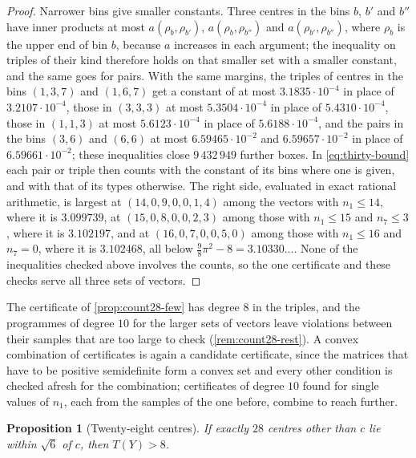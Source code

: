 \documentclass[11pt,reqno]{amsart}
\renewcommand{\_}{\origunderscore\allowbreak}
\numberwithin{equation}{section}
\theoremstyle{plain}
\newtheorem{prop}[thm]{Proposition}
\theoremstyle{definition}
\theoremstyle{remark}
\begin{document}
\begin{proof}
Narrower bins give smaller constants. Three centres in the bins $b$, $b'$ and
$b''$ have inner products at most $a(\rho_b,\rho_{b'})$, $a(\rho_b,\rho_{b''})$
and $a(\rho_{b'},\rho_{b''})$, where $\rho_b$ is the upper end of bin $b$,
because $a$ increases in each argument; the inequality on triples of their kind
therefore holds on that smaller set with a smaller constant, and the same goes
for pairs. With the same margins, the triples of centres in the bins $(1,3,7)$
and $(1,6,7)$ get a constant of at most $3.1835\cdot10^{-4}$ in place of
$3.2107\cdot10^{-4}$, those in $(3,3,3)$ at most $5.3504\cdot10^{-4}$ in place
of $5.4310\cdot10^{-4}$, those in $(1,1,3)$ at most $5.6123\cdot10^{-4}$ in
place of $5.6188\cdot10^{-4}$, and the pairs in the bins $(3,6)$ and $(6,6)$
at most $6.59465\cdot10^{-2}$ and $6.59657\cdot10^{-2}$ in place of
$6.59661\cdot10^{-2}$; these inequalities close $9\,432\,949$ further boxes. In
\eqref{eq:thirty-bound} each pair or triple then counts with the constant of
its bins where one is given, and with that of its types otherwise. The right
side, evaluated in exact rational arithmetic, is largest at
$(14,0,9,0,0,1,4)$ among the vectors with $n_1\le14$, where it is
$3.099739$, at $(15,0,8,0,0,2,3)$ among those with $n_1\le15$ and
$n_7\le3$, where it is $3.102197$, and at $(16,0,7,0,0,5,0)$ among those with
$n_1\le16$ and $n_7=0$, where it is $3.102468$, all below
$\frac98\pi^2-8=3.10330\ldots$. None of the inequalities checked above
involves the counts, so the one certificate and these checks serve all three
sets of vectors.
\end{proof}

The certificate of \cref{prop:count28-few} has degree $8$ in the triples,
and the programmes of degree $10$ for the larger sets of vectors leave
violations between their samples that are too large to check
(\cref{rem:count28-rest}). A convex combination of certificates is again a
candidate certificate, since the matrices that have to be positive
semidefinite form a convex set and every other condition is checked afresh
for the combination; certificates of degree $10$ found for single values of
$n_1$, each from the samples of the one before, combine to reach further.

\begin{prop}[Twenty-eight centres]\label{prop:count28-mixed}
If exactly $28$ centres other than $c$ lie within $\sqrt6$ of $c$, then
$T(Y)>8$.
\end{prop}
\end{document}
